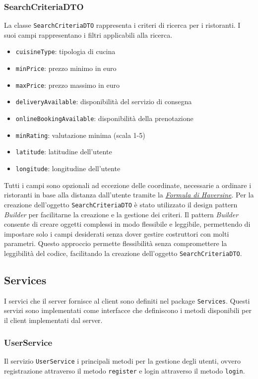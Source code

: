 \subsubsection{SearchCriteriaDTO}
\label{sec:searchcriteriadto}
La classe \texttt{SearchCriteriaDTO} rappresenta i criteri di 
ricerca per i ristoranti.
I suoi campi rappresentano i filtri applicabili alla ricerca.
\begin{itemize}
    \item \texttt{cuisineType}: tipologia di cucina
    \item \texttt{minPrice}: prezzo minimo in euro
    \item \texttt{maxPrice}: prezzo massimo in euro
    \item \texttt{deliveryAvailable}: disponibilità del servizio di consegna
    \item \texttt{onlineBookingAvailable}: disponibilità della prenotazione
    \item \texttt{minRating}: valutazione minima (scala 1-5)
    \item \texttt{latitude}: latitudine dell'utente
    \item \texttt{longitude}: longitudine dell'utente
\end{itemize}
Tutti i campi sono opzionali ad eccezione delle coordinate, 
necessarie a ordinare i ristoranti in base alla distanza
dall'utente tramite la 
\textit{\href{https://rosettacode.org/wiki/Haversine_formula}{Formula di Haversine}}.
Per la creazione dell'oggetto \texttt{SearchCriteriaDTO} è stato
utilizzato il design pattern \textit{Builder} per facilitarne la
creazione e la gestione dei criteri.
Il pattern \textit{Builder} consente di creare oggetti complessi
in modo flessibile e leggibile, permettendo di impostare solo i
campi desiderati senza dover gestire costruttori con molti 
parametri.
Questo approccio permette flessibilità senza compromettere la
leggibilità del codice, facilitando la creazione dell'oggetto
\texttt{SearchCriteriaDTO}.

\subsection{Services}
I servici che il server fornisce al client sono definiti nel 
package \texttt{Services}.
Questi servizi sono implementati come interfacce che definiscono
i metodi disponibili per il client implementati dal server.

\subsubsection{UserService}
Il servizio \texttt{UserService} i principali metodi per la gestione
degli utenti, ovvero registrazione attraverso il metodo
\texttt{register} e login attraverso il metodo \texttt{login}.

